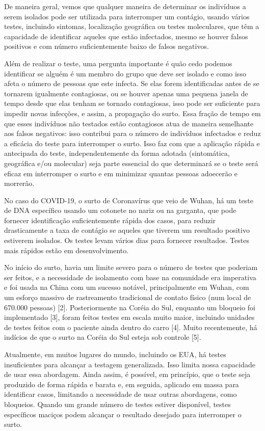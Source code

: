 \documentclass[onecolumn,journal]{IEEEtran}
\begin{document}
\begin{multicols}{2}
De maneira geral, vemos que qualquer maneira de determinar os indivíduos a serem isolados pode ser utilizada para interromper um contágio, usando vários testes, incluindo sintomas, localização geográfica ou testes moleculares, que têm a capacidade de identificar aqueles que estão infectados, mesmo se houver falsos positivos e com número suficientemente baixo de falsos negativos.

Além de realizar o teste, uma pergunta importante é quão cedo podemos identificar se alguém é um membro do grupo que deve ser isolado e como isso afeta o número de pessoas que este infecta. Se elas forem identificadas antes de se tornarem igualmente contagiosas, ou se houver apenas uma pequena janela de tempo desde que elas tenham se tornado contagiosas, isso pode ser suficiente para impedir novas infecções, e assim, a propagação do surto. Essa fração de tempo em que esses indivíduos não testados estão contagiosos atua de maneira semelhante aos falsos negativos: isso contribui para o número de indivíduos infectados e reduz a eficácia do teste para interromper o surto. Isso faz com que a aplicação rápida e antecipada do teste, independentemente da forma adotada (sintomática, geográfica e/ou molecular) seja parte essencial do que determinará se o teste será eficaz em interromper o surto e em minimizar quantas pessoas adoecerão e morrerão.

No caso do COVID-19, o surto de Coronavírus que veio de Wuhan, há um teste de DNA específico usando um cotonete no nariz ou na garganta, que pode fornecer identificação suficientemente rápida dos casos, para reduzir drasticamente a taxa de contágio se aqueles que tiverem um resultado positivo estiverem isolados. Os testes levam vários dias para fornecer resultados. Testes mais rápidos estão em desenvolvimento.

No início do surto, havia um limite severo para o número de testes que poderiam ser feitos, e a necessidade de isolamento com base na comunidade era imperativa e foi usada na China com um sucesso notável, principalmente em Wuhan, com um esforço massivo de rastreamento tradicional de contato físico (num local de 670.000 pessoas) [2]. Posteriormente na Coréia do Sul, enquanto um bloqueio foi implementado [3], foram feitos testes em escala muito maior, incluindo unidades de testes feitos com o paciente ainda dentro do carro [4]. Muito recentemente, há indícios de que o surto na Coréia do Sul esteja sob controle [5].

Atualmente, em muitos lugares do mundo, incluindo os EUA, há testes insuficientes para alcançar a testagem generalizada. Isso limita nossa capacidade de usar essa abordagem. Ainda assim, é possível, em princípio, que o teste seja produzido de forma rápida e barata e, em seguida, aplicado em massa para identificar casos, limitando a necessidade de usar outras abordagens, como bloqueios. Quando um grande número de testes estiver disponível, testes específicos maciços podem alcançar o resultado desejado para interromper o surto.


\end{multicols}
\end{document}
